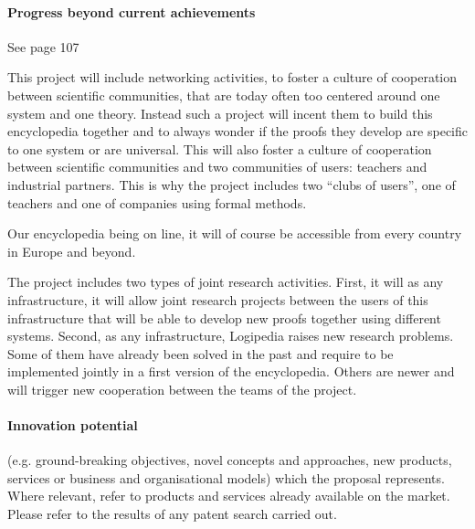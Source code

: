 \paragraph{Progress beyond current achievements}

See page 107

This project will include networking activities, to foster a culture
of cooperation between scientific communities, that are today often
too centered around one system and one theory. Instead such a project
will incent them to build this encyclopedia together and to always
wonder if the proofs they develop are specific to one system or are
universal. This will also foster a culture of cooperation between
scientific communities and two communities of users: teachers and
industrial partners. This is why the project includes two ``clubs of
users'', one of teachers and one of companies using formal methods.

Our encyclopedia being on line, it will of course be accessible from
every country in Europe and beyond.

The project includes two types of joint research activities.  First,
it will as any infrastructure, it will allow joint research projects
between the users of this infrastructure that will be able to develop
new proofs together using different systems. Second, as any
infrastructure, {\sc Logipedia} raises new research problems. Some of
them have already been solved in the past and require to be
implemented jointly in a first version of the encyclopedia. Others are
newer and will trigger new cooperation between the teams of the project.

\paragraph{Innovation potential}

(e.g. ground-breaking objectives,
novel concepts and approaches, new products, services or business and
organisational models) which the proposal represents. Where relevant,
refer to products and services already available on the market. Please
refer to the results of any patent search carried out.








